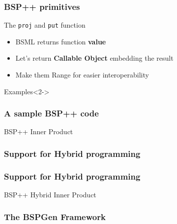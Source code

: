 \frame
{
  \frametitle{BSP++ primitives}
  \begin{block}{The \texttt{proj} and \texttt{put} function}
  \begin{itemize}
  \footnotesize
  \item BSML returns function \textbf{value}
  \item Let's return \textbf{Callable Object} embedding the result
  \item Make them Range for easier interoperability 
  \end{itemize} 
  \end{block}{}

  \begin{block}{Examples}<2->
  \end{block}{}
}

\frame
{
  \frametitle{A sample BSP++ code}
  \begin{block}{BSP++ Inner Product}
   \lstbspinnerproduct
  \end{block}{}
}

\frame
{
  \frametitle{Support for Hybrid programming}
  \begin{center}
  \end{center}
}

\frame
{
  \frametitle{Support for Hybrid programming}
  \begin{block}{BSP++ Hybrid Inner Product}
  \lstbsphybridinnerproduct
  \end{block}{}
}

\frame
{
  \frametitle{The BSPGen Framework}
  \begin{center}\end{center}
}

